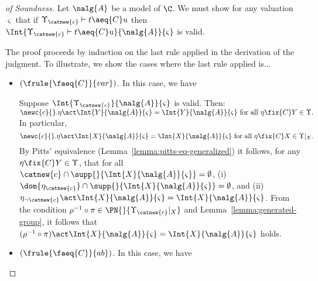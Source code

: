 \begin{proof}[of Soundness]
     Let $\nalg{A}$ be a model of $\C$. We must show for any valuation $\varsigma$ that if $\Upsilon_{\catnew{c}} \vdash t\aeq{C} u$ then $\Int{\Upsilon_{\catnew{c}} \vdash t\aeq{C} u}{\nalg{A}}{\varsigma}$ is valid.

     The proof proceeds by induction on the last rule applied in the derivation of the judgment. To illustrate, we show the cases where the last rule applied is...
     \begin{itemize}
         \item $(\frule{\faeq{C}}{var})$. In this case, we have
            \begin{prooftree}
            \end{prooftree}
%
            Suppose $\Int{\Upsilon_{\catnew{c}}}{\nalg{A}}{\varsigma}$ is valid. Then:
            \(
                \newc{c}{}. \eta\act \Int{Y}{\nalg{A}}{\varsigma} =  \Int{Y}{\nalg{A}}{\varsigma} \text{ for all $\eta\fix{C} Y\in \Upsilon$.}
            \)
            In particular,
            \[
                \newc{c}{}. \eta\act \Int{X}{\nalg{A}}{\varsigma} =  \Int{X}{\nalg{A}}{\varsigma} \text{ for all $\eta\fix{C} X\in \Upsilon|_X$.}
            \]
            By Pitts' equivalence (Lemma~\ref{lemma:pitts-eq-generalized}) it follows, for any $\eta\fix{C} Y\in \Upsilon$, that for all $\catnew{c}\cap \supp{}{\Int{X}{\nalg{A}}{\varsigma}} = \emptyset$,
            (i) $\dom{\eta_{\catnew{c}}}\cap\supp{}{\Int{X}{\nalg{A}}{\varsigma}}=\emptyset$,
                and
                (ii) $\eta_{\neg\catnew{c}}\act \Int{X}{\nalg{A}}{\varsigma} =  \Int{X}{\nalg{A}}{\varsigma}$. From the condition $\rho^{-1}\circ\pi \in \PN{}{\Upsilon_{\catnew{c}}|_X}$ and Lemma~\ref{lemma:generated-group}, it follows that $(\rho^{-1}\circ\pi) \act \Int{X}{\nalg{A}}{\varsigma} =  \Int{X}{\nalg{A}}{\varsigma}$ holds.

            \item $(\frule{\faeq{C}}{ab})$. In this case, we have
           \begin{prooftree}
           \end{prooftree}


\end{itemize}
\end{proof}
